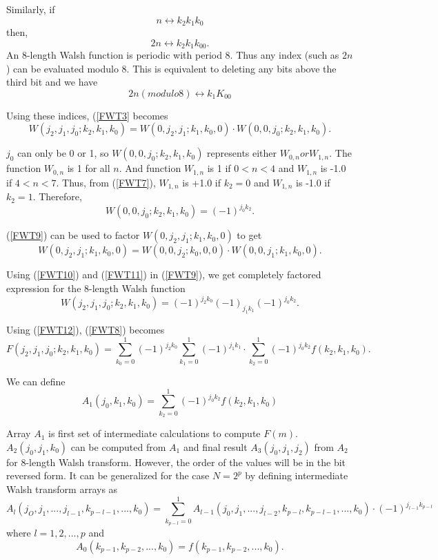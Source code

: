 Similarly, if
\[
n \leftrightarrow k_2k_1k_0
\]
then,
\[
2n \leftrightarrow k_2k_1k_00.
\]
An 8-length Walsh function is periodic with period 8. Thus any index (such as $2n$) can be evaluated modulo 8. This is equivalent to deleting any bits above the third bit and we have 
\[
2n(modulo 8) \leftrightarrow k_1K_00
\]

Using these indices, (\ref{FWT3} becomes
\begin{equation}
\label{FWT9}
W(j_2,j_1,j_0;k_2,k_1,k_0) = W(0,j_2,j_1;k_1,k_0,0) \cdot W(0,0,j_0;k_2,k_1,k_0).
\end{equation}

$j_0$ can only be 0 or 1, so $W(0,0,j_0; k_2, k_1, k_0)$ represents either $W_{0,n} or W_{1,n}$. The function $W_{0,n}$ is 1 for all $n$. And function $W_{1,n}$ is 1 if $0<n<4$ and $W_{1,n}$ is -1.0 if $4<n<7$. Thus, from (\ref{FWT7}), $W_{1,n}$ is +1.0 if $k_2=0$ and $W_{1,n}$ is -1.0 if $k_2 = 1$. Therefore, 
\begin{equation}
\label{FWT10}
W(0,0,j_0;k_2,k_1,k_0) = (-1)^{j_0k_2}.
\end{equation}

(\ref{FWT9}) can be used to factor $W(0,j_2,j_1;k_1,k_0,0)$ to get
\begin{equation}
\label{FWT11}
W(0,j_2,j_1;k_1,k_0,0) = W(0,0,j_2;k_0,0,0) \cdot W(0,0,j_1;k_1,k_0,0).
\end{equation}

Using (\ref{FWT10}) and (\ref{FWT11}) in (\ref{FWT9}), we get completely factored expression for the 8-length Walsh function
\begin{equation}
\label{FWT12}
W(j_2,j_1,j_0;k_2,k_1,k_0) = (-1)^{j_2k_0}(-1)_{j_1k_1}(-1)^{j_0k_2}.
\end{equation}

Using (\ref{FWT12}), (\ref{FWT8}) becomes 
\begin{equation}
\label{FWT13}
F(j_2,j_1,j_0;k_2,k_1,k_0) = \sum\limits_{k_0=0}^1 (-1)^{j_2k_0} \sum\limits_{k_1=0}^1 (-1)^{j_1k_1}  \cdot  \sum\limits_{k_2=0}^1 (-1)^{j_0k_2} f(k_2,k_1,k_0).
\end{equation}

We can define
\begin{equation}
\label{FWT14}
A_1(j_0,k_1,k_0) = \sum\limits_{k_2=0}^1 (-1)^{j_0k_2} f(k_2,k_1,k_0)
\end{equation}

Array $A_1$ is first set of intermediate calculations to compute $F(m)$. $A_2(j_0,j_1,k_0)$ can be computed from $A_1$ and final result $A_3(j_0,j_1,j_2)$ from $A_2$ for 8-length Walsh transform. However, the order of the values will be in the bit reversed form. It can be generalized for the case $N = 2^p$ by defining intermediate Walsh transform arrays as
\begin{equation}
\label{FWT15}
A_l(j_O,j_1,...,j_{l-1},k_{p-l-1},...,k_0) = \sum\limits_{k_{p-l}=0}^1 A_{l-1}(j_0,j_1,...,j_{l-2},k_{p-l},k_{p-l-1},...,k_0) \cdot (-1)^{j_{l-1}k_{p-l}}
\end{equation}
where $l = 1,2,...,p$ and 
\begin{equation}
\label{FWT16}
A_0(k_{p-1},k_{p-2},...,k_0) = f(k_{p-1},k_{p-2},...,k_0).
\end{equation}

